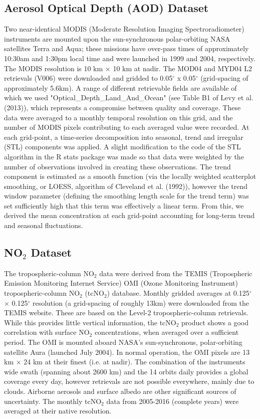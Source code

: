 \documentclass[9pt,twocolumn,twoside,lineno]{pnas-new}
\begin{document}
{\subsection*{Aerosol Optical Depth (AOD) Dataset}\label{aod}
Two near-identical MODIS (Moderate Resolution Imaging Spectroradiometer) instruments are mounted upon the sun-synchronous polar-orbiting NASA satellites Terra and Aqua; these missions have over-pass times of approximately 10:30am and 1:30pm local time and were launched in 1999 and 2004, respectively. The MODIS resolution is 10 km $\times$ 10 km at nadir. The MOD04 and MYD04 L2 retrievals (V006) were downloaded and gridded to 0.05$^\circ$ x 0.05$^\circ$ (grid-spacing of approximately 5.6km). A range of different retrievable fields are available of which we used "Optical\_Depth\_Land\_And\_Ocean" (see Table B1 of Levy et al. (2013)\cite{Levy2013}), which represents a compromise between quality and coverage. These data were averaged to a monthly temporal resolution on this grid, and the number of MODIS pixels contributing to each averaged value were recorded. At each grid-point, a time-series decomposition into seasonal, trend and irregular (STL) components was applied\cite{Cleveland1990}. A slight modification to the code of the STL algorithm in the R stats package\cite{RCoreTeam2015} was made so that data were weighted by the number of observations involved in creating these observations. The trend component is estimated as a smooth function (via the locally weighted scatterplot smoothing, or LOESS, algorithm of Cleveland et al. (1992)\cite{Cleveland1992}), however the trend window parameter (defining the smoothing length scale for the trend term) was set sufficiently high that this term was effectively a linear term. From this, we derived the mean concentration at each grid-point accounting for long-term trend and seasonal fluctuations.

\subsection*{NO$_{2}$ Dataset}\label{no2}
The tropospheric-column NO$_{2}$ data were derived from the TEMIS (Tropospheric Emission Monitoring Internet Service) OMI (Ozone Monitoring Instrument) tropospheric-column NO$_{2}$ (tcNO$_{2}$) database\cite{Boersma2007a}. Monthly gridded averages at 0.125$^\circ$ $\times$ 0.125$^\circ$ resolution (a grid-spacing of roughly 13km) were downloaded from the TEMIS website. These are based on the Level-2 tropospheric-column retrievals. While this provides little vertical information, the tcNO$_{2}$ product shows a good correlation with surface NO$_{2}$ concentrations, when averaged over a sufficient period. The OMI is mounted aboard NASA's sun-synchronous, polar-orbiting satellite Aura (launched July 2004). In normal operation, the OMI pixels are 13 km $\times$ 24 km at their finest (i.e. at nadir). The combination of the instruments wide swath (spanning about 2600 km) and the 14 orbits daily provides a global coverage every day, however retrievals are not possible everywhere, mainly due to clouds. Airborne aerosols and surface albedo are other significant sources of uncertainty. The monthly tcNO$_{2}$ data from 2005-2016 (complete years) were averaged at their native resolution.

}
\end{document}
